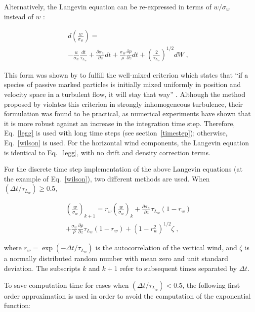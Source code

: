 \documentclass{egu}                  %
\begin{document}
Alternatively, the Langevin equation can be re-expressed in terms of
$w/\sigma_w$ instead of $w$ \citep{wilson1983}:

\begin{multline}
d \left( \frac{w}{\sigma_w} \right) =\\
- \frac{w}{\sigma_w} \frac{dt}{\tau_{L_w}}
+ \frac{\partial \sigma_w}{\partial z} dt
+ \frac{\sigma_w}{\rho} \frac{\partial \rho}{\partial z} dt
+ \left( \frac{2}{\tau_{L_w}} \right)^{1/2} dW \;,
\label{wilson}
\end{multline}

This form was shown by \citet{thomson1987} to fulfill the well-mixed criterion
which states that ``if a species of passive marked particles is initially mixed
uniformly in position and velocity space in a turbulent flow, it will stay that
way'' \citep{rodean1996}.  Although the method proposed by \citet{legg1982}
violates this criterion in strongly inhomogeneous turbulence, their formulation
was found to be practical, as numerical experiments have shown that it is more
robust against an increase in the integration time step.  Therefore,
Eq.~\ref{legg} is used with long time steps (see section~\ref{timestep});
otherwise, Eq.~\ref{wilson} is used.  For the horizontal wind components, the
Langevin equation is identical to Eq.~\ref{legg}, with no drift and density
correction terms.

For the discrete time step implementation of the above Langevin equations (at
the example of Eq.~\ref{wilson}), two different methods are used.  When $\left
(\Delta t/\tau_{L_w} \right) \ge 0.5$,

\begin{multline}
\left (\frac{w}{\sigma_w} \right)_{k+1}=
r_w \left (\frac{w}{\sigma_w} \right)_k
+ \frac{\partial \sigma_w}{\partial z} \tau_{L_w} \left (1-r_w \right )\\
+ \frac{\sigma_w}{\rho} \frac{\partial \rho}{\partial z} \tau_{L_w} \left (1-r_w \right )
+ \left (1-r_w^2 \right )^{1/2} \zeta \;,
\end{multline}

where $r_w=\exp(-\Delta t/ \tau_{L_w})$ is the autocorrelation of the vertical
wind, and $\zeta$ is a normally distributed random number with mean zero and
unit standard deviation.  The subscripts $k$ and $k+1$ refer to subsequent
times separated by $\Delta t$.

To save computation time for cases when $\left (\Delta t/\tau_{L_w} \right) <
0.5$, the following first order approximation is used in order to avoid the
computation of the exponential function:
\end{document}
